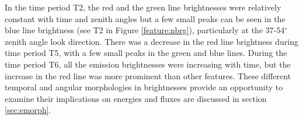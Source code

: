 In the time period T2, the red and the green line brightnesses were relatively constant with time and zenith angles but a few small peaks can be seen in the blue line brightness (see T2 in Figure \ref{feature:nbrg}), particularly at the 37-54$^\circ$ zenith angle look direction. 
There was a decrease in the red line brightness during time period T5, with a few small peaks in the green and blue lines. During the time period T6, all the emission brightnesses were increasing with time, but the increase in the red line was more prominent than other features. These different temporal and angular morphologies in brightnesses provide an opportunity to examine their implications on energies and fluxes are discussed in section \ref{sec:emorph}.


